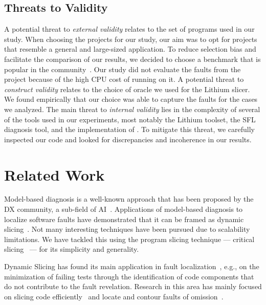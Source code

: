 \documentclass{article}
\begin{document}
\subsection{Threats to Validity}
%
A potential threat to \textit{external validity} relates to the set of programs used in
our study. When choosing the projects for our study, our aim was to opt for
projects that resemble a general and large-sized application. To reduce
selection bias and facilitate the comparison of our results, we decided to
choose a benchmark that is popular in the community~\cite{just-defects4j-issta2014}. 
Our study did not evaluate the faults from the \closure{}
project because of the high CPU cost of running  on it. A potential
threat to \textit{construct validity} relates to the choice of oracle
we used for the Lithium slicer. We found empirically that our choice was able to capture 
the faults for the cases we analyzed.
The main threat to \textit{internal validity} lies in the complexity of several of the tools
used in our experiments, most notably the Lithium toolset, the SFL diagnosis tool,
and the implementation of \comb{}. To mitigate this threat, we
carefully inspected our code and looked for discrepancies and
incoherence in our results.

%
\section{Related Work}

Model-based diagnosis is a well-known approach that has been proposed by the DX
community, a sub-field of
AI~\cite{REITER198757,wotawa2002relationship,DEKLEER200325}. Applications of
model-based diagnosis to localize software faults have demonstrated that it can
be framed as dynamic
slicing~\cite{Mayer:2008:EMM:1642931.1642950,mayer2008prioritising,nica2013use}.
Not many interesting techniques have been pursued due to scalability
limitations. We have tackled this using the program slicing technique ---
critical slicing~\cite{DeMillo:1996:CSS:229000.226310} --- for its simplicity
and generality.

Dynamic Slicing has found its main application in fault
localization~\cite{Agrawal:1990:DPS:93542.93576}, e.g.,  on the minimization of
failing tests through the identification of code components that do not
contribute to the fault revelation. Research in this area has mainly focused on
slicing code
efficiently~\cite{Wang:2008:DSJ:1330017.1330021,Wang:2004:UCB:998675.999455} and
locate and contour faults of
omission~\cite{Zhang:2007:TLE:1250734.1250782,Lin:2018:BDE:3238147.3238163}.
\end{document}
